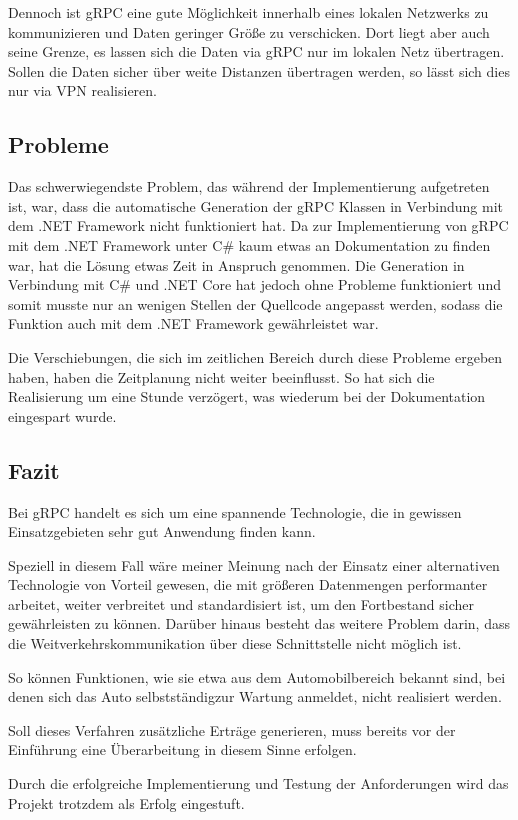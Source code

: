 Dennoch ist {\acs{gRPC}} eine gute Möglichkeit innerhalb eines lokalen Netzwerks zu kommunizieren und Daten geringer Größe zu verschicken. Dort liegt aber auch seine Grenze, es lassen sich die Daten via {\acs{gRPC}} nur im lokalen Netz übertragen. Sollen die Daten sicher über weite Distanzen übertragen werden, so lässt sich dies nur via {\acs{VPN}} realisieren.

\subsection{Probleme}
\label{sec:Probleme}
Das schwerwiegendste Problem, das während der Implementierung aufgetreten ist, war, dass die automatische Generation der {\acs{gRPC}} Klassen in Verbindung mit dem .NET Framework nicht funktioniert hat. Da zur Implementierung von {\acs{gRPC}} mit dem .NET Framework unter C\# kaum etwas an Dokumentation zu finden war, hat die Lösung etwas Zeit in Anspruch genommen. Die Generation in Verbindung mit C\# und .NET Core hat jedoch ohne Probleme funktioniert und somit musste nur an wenigen Stellen der Quellcode angepasst werden, sodass die Funktion auch mit dem .NET Framework gewährleistet war.

Die Verschiebungen, die sich im zeitlichen Bereich durch diese Probleme ergeben haben, haben die Zeitplanung nicht weiter beeinflusst. So hat sich die Realisierung um eine Stunde verzögert, was wiederum bei der Dokumentation eingespart wurde.

\subsection{Fazit}
\label{sec:Fazit}
Bei {\acs{gRPC}} handelt es sich um eine spannende Technologie, die in gewissen Einsatzgebieten sehr gut Anwendung finden kann.

Speziell in diesem Fall wäre meiner Meinung nach der Einsatz einer alternativen Technologie von Vorteil gewesen, die mit größeren Datenmengen performanter arbeitet, weiter verbreitet und standardisiert ist, um den Fortbestand sicher gewährleisten zu können. Darüber hinaus besteht das weitere Problem darin, dass die Weitverkehrskommunikation über diese Schnittstelle nicht möglich ist. 

So können Funktionen, wie sie etwa aus dem Automobilbereich bekannt sind, bei denen sich das Auto \glqq selbstständig\grqq \space zur Wartung anmeldet, nicht realisiert werden. 

Soll dieses Verfahren zusätzliche Erträge generieren, muss bereits vor der Einführung eine Überarbeitung in diesem Sinne erfolgen.

Durch die erfolgreiche Implementierung und Testung der Anforderungen wird das Projekt trotzdem als Erfolg eingestuft.